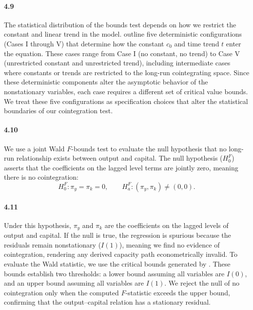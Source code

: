 \paragraph{4.9}
The statistical distribution of the bounds test depends on how we restrict the constant and linear trend in the model. \citet{Pesaran2001} outline five deterministic configurations (Cases I through V) that determine how the constant $c_0$ and time trend $t$ enter the equation. These cases range from Case I (no constant, no trend) to Case V (unrestricted constant and unrestricted trend), including intermediate cases where constants or trends are restricted to the long-run cointegrating space. Since these deterministic components alter the asymptotic behavior of the nonstationary variables, each case requires a different set of critical value bounds. We treat these five configurations as specification choices that alter the statistical boundaries of our cointegration test.

\paragraph{4.10}
We use a joint Wald $F$-bounds test to evaluate the null hypothesis that no long-run relationship exists between output and capital. The null hypothesis ($H_0^F$) asserts that the coefficients on the lagged level terms are jointly zero, meaning there is no cointegration:
\begin{equation}
H_{0}^{F}: \pi_y=\pi_k=0, \qquad H_{a}^{F}: (\pi_y,\pi_k)\neq(0,0).
\label{eq:fbounds_hypothesis}
\end{equation}

\paragraph{4.11}
Under this hypothesis, $\pi_y$ and $\pi_k$ are the coefficients on the lagged levels of output and capital. If the null is true, the regression is spurious because the residuals remain nonstationary ($I(1)$), meaning we find no evidence of cointegration, rendering any derived capacity path econometrically invalid. To evaluate the Wald statistic, we use the critical bounds generated by \citet{Pesaran2001}. These bounds establish two thresholds: a lower bound assuming all variables are $I(0)$, and an upper bound assuming all variables are $I(1)$. We reject the null of no cointegration only when the computed $F$-statistic exceeds the upper bound, confirming that the output--capital relation has a stationary residual.

